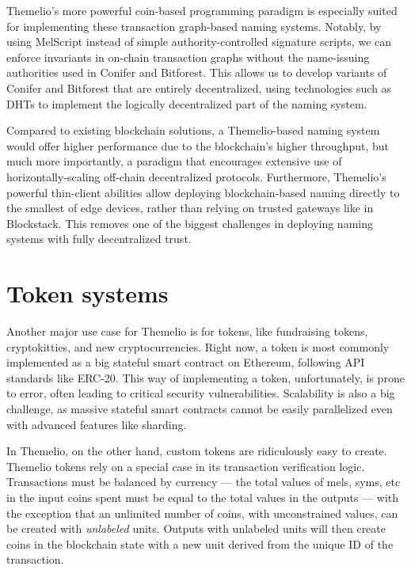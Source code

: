 \documentclass[headinclude,12pt]{scrbook}
\begin{document}
Themelio's more powerful coin-based programming paradigm is especially suited for implementing these transaction graph-based naming systems. Notably, by using MelScript instead of simple authority-controlled signature scripts, we can enforce invariants in on-chain transaction graphs without the name-issuing authorities used in Conifer and Bitforest. This allows us to develop variants of Conifer and Bitforest that are entirely decentralized, using technologies such as DHTs to implement the logically decentralized part of the naming system.

Compared to existing blockchain solutions, a Themelio-based naming system would offer higher performance due to the blockchain's higher throughput, but much more importantly, a paradigm that encourages extensive use of horizontally-scaling off-chain decentralized protocols. Furthermore, Themelio's powerful thin-client abilities allow deploying blockchain-based naming directly to the smallest of edge devices, rather than relying on trusted gateways like in Blockstack. This removes one of the biggest challenges in deploying naming systems with fully decentralized trust.

\section{Token systems}

Another major use case for Themelio is for tokens, like fundraising tokens, cryptokitties, and new cryptocurrencies. Right now, a token is most commonly implemented as a big stateful smart contract on Ethereum, following API standards like ERC-20. This way of implementing a token, unfortunately, is prone to error, often leading to critical security vulnerabilities. Scalability is also a big challenge, as massive stateful smart contracts cannot be easily parallelized even with advanced features like sharding.

In Themelio, on the other hand, custom tokens are ridiculously easy to create. Themelio tokens rely on a special case in its transaction verification logic. Transactions must be balanced by currency --- the total values of mels, syms, etc in the input coins spent must be equal to the total values in the outputs --- with the exception that an unlimited number of coins, with unconstrained values, can be created with \textit{unlabeled} units. Outputs with unlabeled units will then create coins in the blockchain state with a new unit derived from the unique ID of the transaction.
\end{document}
